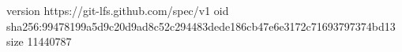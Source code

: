 version https://git-lfs.github.com/spec/v1
oid sha256:99478199a5d9c20d9ad8c52c294483dede186cb47e6e3172c71693797374bd13
size 11440787
